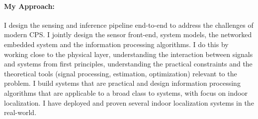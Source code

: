 \documentclass[10pt]{article}
\begin{document}
\paragraph{My Approach: }
I design the sensing and inference pipeline end-to-end to address the challenges of modern CPS. I jointly design the sensor front-end, system models, the networked embedded system and the information processing algorithms. I do this by working close to the physical layer, understanding the interaction between signals and systems from first principles, understanding the practical constraints and the theoretical tools (signal processing, estimation, optimization) relevant to the problem. 
I build systems that are practical and design information processing algorithms that are applicable to a broad class to systems, with focus on indoor localization. I have deployed and proven several indoor localization systems in the real-world.

\end{document}
